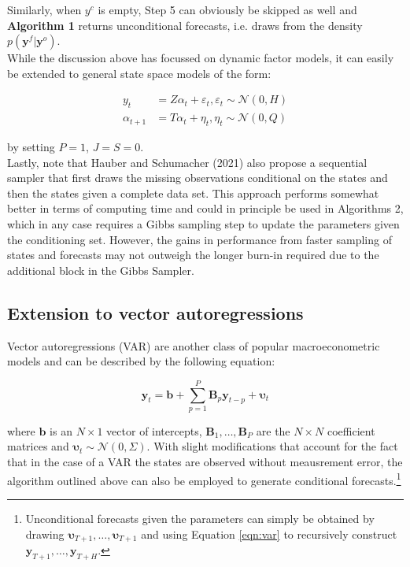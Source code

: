 \documentclass[notitlepage,a4paper,12pt]{article}
\begin{document}
Similarly, when $y^c$ is empty, Step 5 can obviously be skipped as well and \textbf{Algorithm 1} returns unconditional forecasts, i.e. draws from the density $p(\mathbf{y}^f | \mathbf{y}^o)$.\\

While the discussion above has focussed on dynamic factor models, it can easily be extended to general state space models of the form:

\begin{subequations}
    \label{eqn:statespacesys}
    \begin{align}
    y_t &= Z \alpha_t + \varepsilon_t, \varepsilon_t \sim \mathcal{N}(0, H) \\
    \alpha_{t+1} &= T \alpha_t + \eta_t, \eta_t \sim \mathcal{N}(0, Q) 
    \end{align}
\end{subequations}

by setting $P=1$, $J=S=0$.\\

Lastly, note that Hauber and Schumacher (2021) also propose a sequential sampler that first draws the missing observations conditional on the states and then the states given a complete data set. This approach performs somewhat better in terms of computing time and could in principle be used in Algorithms 2, which in any case requires a Gibbs sampling step to update the parameters given the conditioning set. However, the gains in performance from faster sampling of states and forecasts may not outweigh the longer burn-in required due to the additional block in the Gibbs Sampler.\\

\subsection{Extension to vector autoregressions}

Vector autoregressions (VAR) are another class of popular macroeconometric models and can be described by the following equation: 

\begin{equation}\label{eqn:var}
    \mathbf{y}_t = \mathbf{b} + \sum_{p=1}^P \mathbf{B}_p \mathbf{y}_{t-p} + \boldsymbol{\upsilon}_t
\end{equation}

where $\mathbf{b}$ is an $N \times 1$ vector of intercepts, $\mathbf{B}_1, \dots, \mathbf{B}_P$ are the $N \times N$ coefficient matrices and $\boldsymbol{\upsilon}_t \sim \mathcal{N}(0, \Sigma)$. With slight modifications that account for the fact that in the case of a VAR the states are observed without meausrement error, the algorithm outlined above can also be employed to generate conditional forecasts.\footnote{Unconditional forecasts given the parameters can simply be obtained by drawing $\boldsymbol{\upsilon}_{T+1}, \dots, \boldsymbol{\upsilon}_{T+1}$ and using Equation \ref{eqn:var} to recursively construct $\mathbf{y}_{T+1}, \dots, \mathbf{y}_{T+H}$.}
\end{document}
